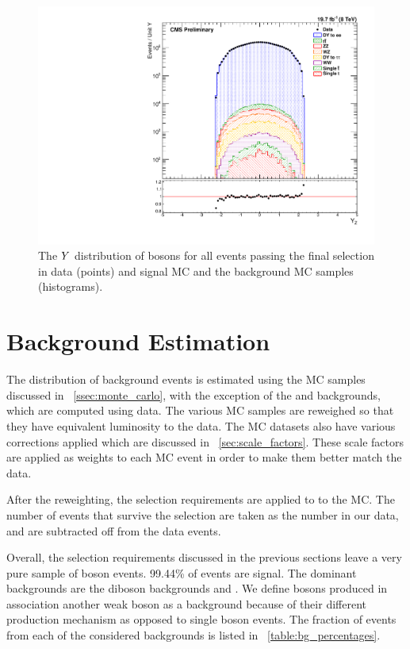 \begin{figure}[!htbp]
    \centering
    \includegraphics[width=\textwidth]{figures/z_rapidity_powheg.pdf}
    \caption[
        The $\rapidity$ distribution of \Z bosons in data and MC with \POWHEG
        signal MC.
    ]{
        The $\rapidity$ distribution of \Z bosons for all events passing the
        final selection in data (points) and \POWHEG signal MC and the
        background MC samples (histograms).
    }
    \label{fig:z_rapidity_powheg}
\end{figure}

\section{Background Estimation}
\label{sec:background}

The distribution of background events is estimated using the MC samples
discussed in \SEC~\ref{ssec:monte_carlo}, with the exception of the \QCDjets
and \wjets backgrounds, which are computed using data. The various MC samples
are reweighed so that they have equivalent luminosity to the data. The MC
datasets also have various corrections applied which are discussed in
\SEC~\ref{sec:scale_factors}. These scale factors are applied as weights to
each MC event in order to make them better match the data.

After the reweighting, the selection requirements are applied to to the MC. The
number of events that survive the selection are taken as the number in our
data, and are subtracted off from the data events.

Overall, the selection requirements discussed in the previous sections leave a
very pure sample of \Z boson events. 99.44\% of events are signal. The dominant
backgrounds are the diboson backgrounds and \ttbar. We define \Z bosons
produced in association another weak boson as a background because of their
different production mechanism as opposed to single \Z boson events. The
fraction of events from each of the considered backgrounds is listed in
\TAB~\ref{table:bg_percentages}.

